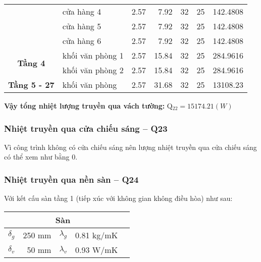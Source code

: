 \begin{table}[H]
\begin{adjustbox}{width=\textwidth}
\begin{tabular}{|c|l|r|r|r|r|r|}
		\cline{2-7}          & cửa hàng 4 & 2.57  & 7.92  & 32    & 25    & 142.4808 \bigstrut\\
		\cline{2-7}          & cửa hàng 5 & 2.57  & 7.92  & 32    & 25    & 142.4808 \bigstrut\\
		\cline{2-7}          & cửa hàng 6 & 2.57  & 7.92  & 32    & 25    & 142.4808 \bigstrut\\
		\hline
		\multirow{2}[4]{*}{\textbf{Tầng 4}} & khối văn phòng 1 & 2.57  & 15.84 & 32    & 25    & 284.9616 \bigstrut\\
		\cline{2-7}          & khối văn phòng 2 & 2.57  & 15.84 & 32    & 25    & 284.9616 \bigstrut\\
		\hline
		\textbf{Tầng 5 - 27} & khối văn phòng & 2.57  & 31.68 & 32    & 25    & 13108.23 \bigstrut\\
		\hline
	\end{tabular}%
	\end{adjustbox}
	\label{b:ntqcrv}%
\end{table}%

\textbf{Vậy tổng nhiệt lượng truyền qua vách tường:} Q$_{22} = 15174.21(W)$

\subsubsection{Nhiệt truyền qua cửa chiếu sáng -- Q{\scriptsize 23}}

Vì công trình không có cửa chiếu sáng nên lượng nhiệt truyền qua cửa chiếu sáng có thể xem như bằng 0.

\subsubsection{Nhiệt truyền qua nền sàn -- Q{\scriptsize 24}}

Với kết cấu sàn tầng 1 (tiếp xúc với không gian không điều hòa) như sau:

\begin{table}[H]
	\centering
	\begin{tabular}{|r|r|r|r|r|}
		\hline
		\multicolumn{4}{|c|}{\textbf{Sàn}} \bigstrut\\
		\hline
		\textbf{{\large $\delta_{g}$}} & 250 mm & {\large $\lambda_{g}$} & 0.81 kg/mK \bigstrut\\
		\hline
		\textbf{{\large $\delta_{v}$}} & 50 mm & \textbf{{\large $\lambda_{v}$}} & 0.93 W/mK \bigstrut\\	
		\hline
	\end{tabular}
	\label{b:kcs}
\end{table}

